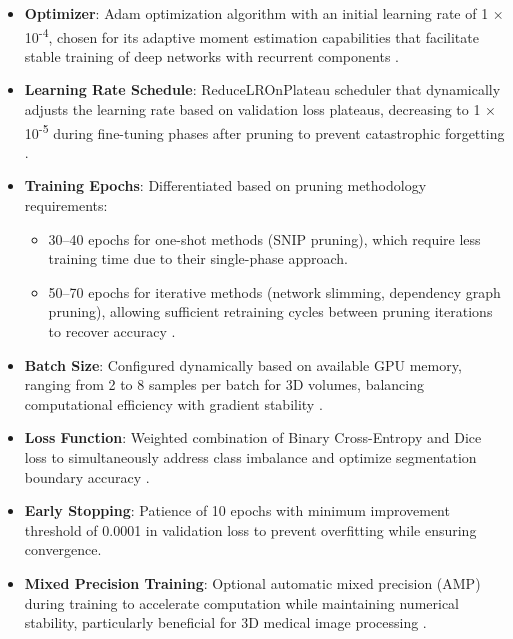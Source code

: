 \documentclass[12pt,a4paper]{article}
\begin{document}
\begin{itemize}
    \item \textbf{Optimizer}: Adam optimization algorithm with an initial learning rate of 1 × 10\textsuperscript{-4}, chosen for its adaptive moment estimation capabilities that facilitate stable training of deep networks with recurrent components \cite{Loshchilov2017}.
    
    \item \textbf{Learning Rate Schedule}: ReduceLROnPlateau scheduler that dynamically adjusts the learning rate based on validation loss plateaus, decreasing to 1 × 10\textsuperscript{-5} during fine-tuning phases after pruning to prevent catastrophic forgetting \cite{Xin2020}.
    
    \item \textbf{Training Epochs}: Differentiated based on pruning methodology requirements:
    \begin{itemize}
        \item 30--40 epochs for one-shot methods (SNIP pruning), which require less training time due to their single-phase approach.
        \item 50--70 epochs for iterative methods (network slimming, dependency graph pruning), allowing sufficient retraining cycles between pruning iterations to recover accuracy \cite{Wu2023, Frankle2018}.
    \end{itemize}
    
    \item \textbf{Batch Size}: Configured dynamically based on available GPU memory, ranging from 2 to 8 samples per batch for 3D volumes, balancing computational efficiency with gradient stability \cite{Masters2018}.
    
    \item \textbf{Loss Function}: Weighted combination of Binary Cross-Entropy and Dice loss to simultaneously address class imbalance and optimize segmentation boundary accuracy \cite{Sudre2017}.
    
    \item \textbf{Early Stopping}: Patience of 10 epochs with minimum improvement threshold of 0.0001 in validation loss to prevent overfitting while ensuring convergence.
    
    \item \textbf{Mixed Precision Training}: Optional automatic mixed precision (AMP) during training to accelerate computation while maintaining numerical stability, particularly beneficial for 3D medical image processing \cite{Micikevicius2018}.
\end{itemize}
\end{document}
